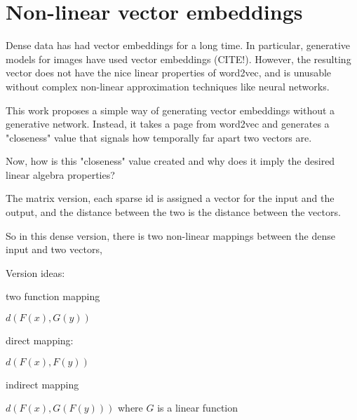 \documentclass{article}
\begin{document}
\section{Non-linear vector embeddings}

Dense data has had vector embeddings for a long time. In particular, generative models for images have used vector embeddings (CITE!). However, the resulting vector does not have the nice linear properties of word2vec, and is unusable without complex non-linear approximation techniques like neural networks.

This work proposes a simple way of generating vector embeddings without a generative network. Instead, it takes a page from word2vec and generates a "closeness" value that signals how temporally far apart two vectors are. 

Now, how is this "closeness" value created and why does it imply the desired linear algebra properties?

The matrix version, each sparse id is assigned a vector for the input and the output, and the distance between the two is the distance between the vectors. 

So in this dense version, there is two non-linear mappings between the dense input and two vectors, 

Version ideas:

two function mapping

$d(F(x),G(y))$

direct mapping:

$d(F(x),F(y))$

indirect mapping

$d(F(x),G(F(y)))$ where $G$ is a linear function


{}

\end{document}
